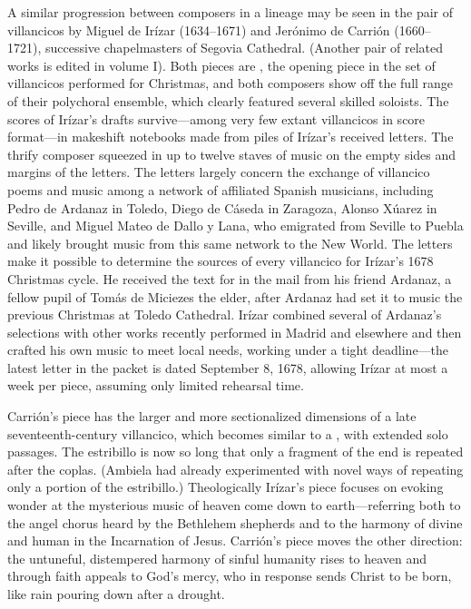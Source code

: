 A similar progression between composers in a lineage may be seen in the pair
of villancicos by Miguel de Irízar (1634--1671) and Jerónimo de Carrión
(1660--1721), successive chapelmasters of Segovia Cathedral. 
(Another pair of related works is edited in volume I).
Both pieces are , the opening piece in the set of
villancicos performed for Christmas, and both composers show off the full
range of their polychoral ensemble, which clearly featured several skilled
soloists.
The scores of Irízar's drafts survive---among very few extant villancicos in
score format---in makeshift notebooks made from piles of Irízar's received
letters.
The thrify composer squeezed in up to twelve staves of music on the empty
sides and margins of the letters.
The letters largely concern the exchange of villancico poems and music among a
network of affiliated Spanish musicians, including Pedro de Ardanaz in Toledo,
Diego de Cáseda in Zaragoza, Alonso Xúarez in Seville, and Miguel Mateo
de Dallo y Lana, who emigrated from Seville to Puebla and likely brought music
from this same network to the New World.
The letters make it possible to determine the sources of every villancico for
Irízar's 1678 Christmas cycle.%
    \Autocites
    {Rodriguez:Networks}
    {Rodriguez:SoloMadrid}
He received the text for  in the mail from his
friend Ardanaz, a fellow pupil of Tomás de Miciezes the elder, after Ardanaz
had set it to music the previous Christmas at Toledo Cathedral.
Irízar combined several of Ardanaz's selections with other works recently
performed in Madrid and elsewhere and then crafted his own music to meet local
needs, working under a tight deadline---the latest letter in the packet is
dated September 8, 1678, allowing Irízar at most a week per piece, assuming
only limited rehearsal time.

Carrión's piece has the larger and more sectionalized dimensions of a late
seventeenth-century villancico, which becomes similar to a ,
with extended solo passages.
The estribillo is now so long that only a fragment of the end is repeated
after the coplas.
(Ambiela had already experimented with novel ways of repeating only a portion
of the estribillo.)%
    \Autocites
    {Calahorra:Suban}
    {Torrente:Estribillo}
Theologically Irízar's piece focuses on evoking wonder at the mysterious music
of heaven come down to earth---referring both to the angel chorus heard by the
Bethlehem shepherds and to the harmony of divine and human in the Incarnation
of Jesus.
Carrión's piece moves the other direction: the untuneful, distempered harmony
of sinful humanity rises to heaven and through faith appeals to God's mercy,
who in response sends Christ to be born, like rain pouring down after a
drought.

